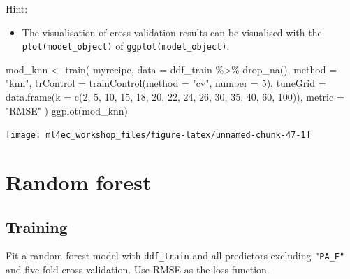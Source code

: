 \documentclass[
]{book}
\newenvironment{Shaded}{\begin{snugshade}}{\end{snugshade}}
\newcommand{\AttributeTok}[1]{\textcolor[rgb]{0.77,0.63,0.00}{#1}}
\newcommand{\DecValTok}[1]{\textcolor[rgb]{0.00,0.00,0.81}{#1}}
\newcommand{\FunctionTok}[1]{\textcolor[rgb]{0.00,0.00,0.00}{#1}}
\newcommand{\NormalTok}[1]{#1}
\newcommand{\OtherTok}[1]{\textcolor[rgb]{0.56,0.35,0.01}{#1}}
\newcommand{\SpecialCharTok}[1]{\textcolor[rgb]{0.00,0.00,0.00}{#1}}
\newcommand{\StringTok}[1]{\textcolor[rgb]{0.31,0.60,0.02}{#1}}
\providecommand{\tightlist}{%
  \setlength{\itemsep}{0pt}\setlength{\parskip}{0pt}}
\begin{document}
Hint:

\begin{itemize}
\tightlist
\item
  The visualisation of cross-validation results can be visualised with the \texttt{plot(model\_object)} of \texttt{ggplot(model\_object)}.
\end{itemize}

\begin{Shaded}
\begin{Highlighting}[]
\NormalTok{mod\_knn }\OtherTok{\textless{}{-}} \FunctionTok{train}\NormalTok{(}
\NormalTok{  myrecipe, }
  \AttributeTok{data =}\NormalTok{ ddf\_train }\SpecialCharTok{\%\textgreater{}\%} 
    \FunctionTok{drop\_na}\NormalTok{(), }
  \AttributeTok{method =} \StringTok{"knn"}\NormalTok{,}
  \AttributeTok{trControl =} \FunctionTok{trainControl}\NormalTok{(}\AttributeTok{method =} \StringTok{"cv"}\NormalTok{, }\AttributeTok{number =} \DecValTok{5}\NormalTok{),}
  \AttributeTok{tuneGrid =} \FunctionTok{data.frame}\NormalTok{(}\AttributeTok{k =} \FunctionTok{c}\NormalTok{(}\DecValTok{2}\NormalTok{, }\DecValTok{5}\NormalTok{, }\DecValTok{10}\NormalTok{, }\DecValTok{15}\NormalTok{, }\DecValTok{18}\NormalTok{, }\DecValTok{20}\NormalTok{, }\DecValTok{22}\NormalTok{, }\DecValTok{24}\NormalTok{, }\DecValTok{26}\NormalTok{, }\DecValTok{30}\NormalTok{, }\DecValTok{35}\NormalTok{, }\DecValTok{40}\NormalTok{, }\DecValTok{60}\NormalTok{, }\DecValTok{100}\NormalTok{)),}
  \AttributeTok{metric =} \StringTok{"RMSE"}
\NormalTok{  )}
\FunctionTok{ggplot}\NormalTok{(mod\_knn)}
\end{Highlighting}
\end{Shaded}

\begin{center}\texttt{[image: ml4ec\_workshop\_files/figure-latex/unnamed-chunk-47-1]} \end{center}

\hypertarget{random-forest-2}{%
\section{Random forest}\label{random-forest-2}}

\hypertarget{training-6}{%
\subsection{Training}\label{training-6}}

Fit a random forest model with \texttt{ddf\_train} and all predictors excluding \texttt{"PA\_F"} and five-fold cross validation. Use RMSE as the loss function.
\end{document}
